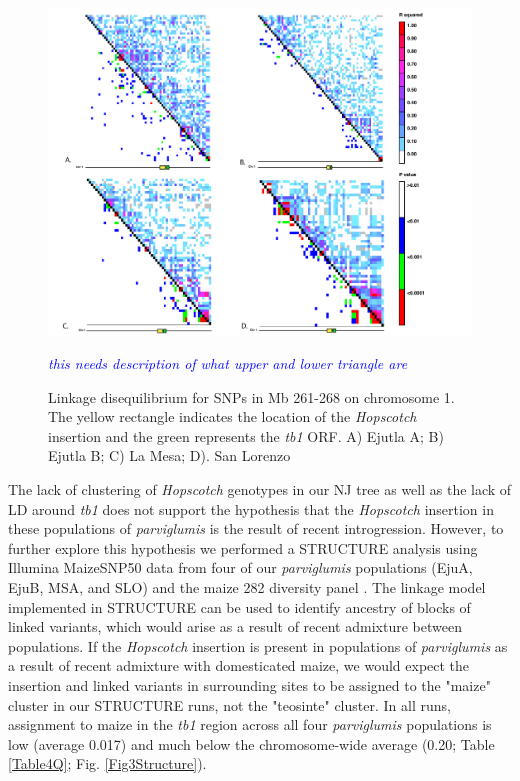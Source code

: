 \documentclass[11pt]{article}
\newcommand{\jri}[1]{\textcolor{blue}{ \emph{\scriptsize  #1}} }
\begin{document}
\begin{linenumbers}
\begin{flushleft}
\begin{figure}[!t]
  \begin{center}
   \includegraphics[width=140mm]{Fig2LDPlots.pdf}
    \caption{Linkage disequilibrium for SNPs in Mb 261-268 on chromosome 1. The yellow rectangle indicates the location of the \emph{Hopscotch} insertion and the green represents the \emph{tb1} ORF. A) Ejutla A; B) Ejutla B; C) La Mesa; D). San Lorenzo}  \jri{this needs description of what upper and lower triangle are}
\label{Fig2LD}
  \end{center}
\end{figure}

The lack of clustering of \emph{Hopscotch} genotypes in our NJ tree as well as the lack of LD around \emph{tb1} does not support the hypothesis that the \emph{Hopscotch} insertion in these populations of \emph{parviglumis} is the result of recent introgression. However, to further explore this hypothesis we performed a STRUCTURE analysis using Illumina MaizeSNP50 data from four of our \emph{parviglumis} populations (EjuA, EjuB, MSA, and SLO) and the maize 282 diversity panel \citep{Cook2012, Pyhajarvi2013}. The linkage model implemented in STRUCTURE can be used to identify ancestry of blocks of linked variants, which would arise as a result of recent admixture between populations. If the \emph{Hopscotch} insertion is present in populations of \emph{parviglumis} as a result of recent admixture with domesticated maize, we would expect the insertion and linked variants in surrounding sites to be assigned to the "maize" cluster in our STRUCTURE runs, not the "teosinte" cluster. In all runs, assignment to maize in the \emph{tb1} region across all four \emph{parviglumis} populations is low (average 0.017) and much below the chromosome-wide average (0.20; Table \ref{Table4Q}; Fig. \ref{Fig3Structure}). 


\end{flushleft}
\end{linenumbers}
\end{document}
